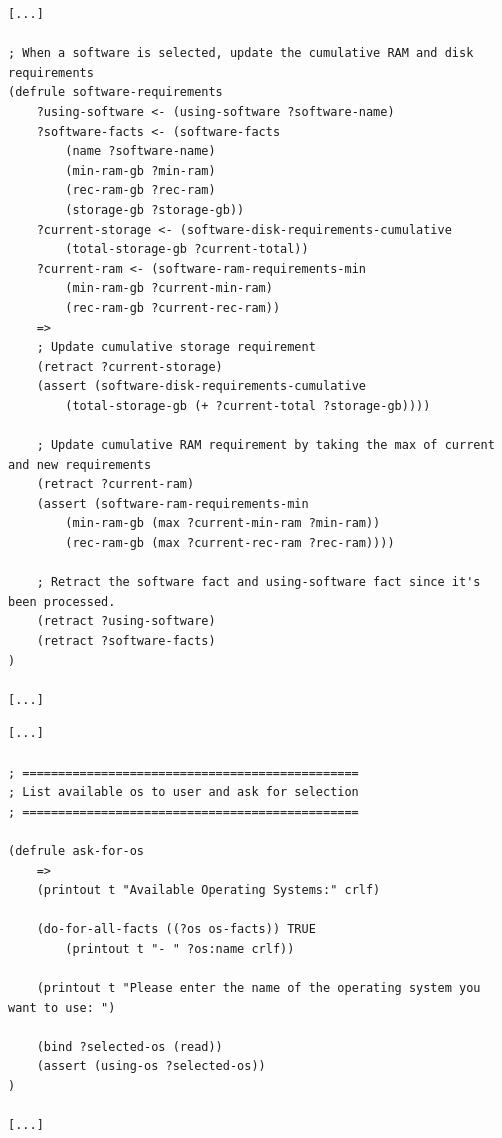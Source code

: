 \documentclass{article}
\begin{document}
\begin{file}
\begin{lstlisting}
[...]

; When a software is selected, update the cumulative RAM and disk requirements
(defrule software-requirements
    ?using-software <- (using-software ?software-name)
    ?software-facts <- (software-facts
        (name ?software-name)
        (min-ram-gb ?min-ram)
        (rec-ram-gb ?rec-ram)
        (storage-gb ?storage-gb))
    ?current-storage <- (software-disk-requirements-cumulative
        (total-storage-gb ?current-total))
    ?current-ram <- (software-ram-requirements-min
        (min-ram-gb ?current-min-ram)
        (rec-ram-gb ?current-rec-ram))
    =>
    ; Update cumulative storage requirement
    (retract ?current-storage)
    (assert (software-disk-requirements-cumulative
        (total-storage-gb (+ ?current-total ?storage-gb))))

    ; Update cumulative RAM requirement by taking the max of current and new requirements
    (retract ?current-ram)
    (assert (software-ram-requirements-min
        (min-ram-gb (max ?current-min-ram ?min-ram))
        (rec-ram-gb (max ?current-rec-ram ?rec-ram))))

    ; Retract the software fact and using-software fact since it's been processed.
    (retract ?using-software)
    (retract ?software-facts)
)

[...]
\end{lstlisting}
\end{file}

\begin{file}
\begin{lstlisting}
[...]

; ===============================================
; List available os to user and ask for selection
; ===============================================

(defrule ask-for-os
    =>
    (printout t "Available Operating Systems:" crlf)

    (do-for-all-facts ((?os os-facts)) TRUE
        (printout t "- " ?os:name crlf))
    
    (printout t "Please enter the name of the operating system you want to use: ")
    
    (bind ?selected-os (read))
    (assert (using-os ?selected-os))
)

[...]
\end{lstlisting}
\end{file}
\end{document}
